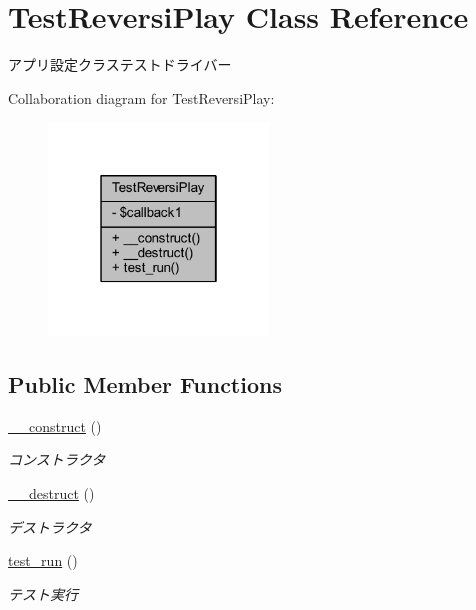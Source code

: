 \hypertarget{class_test_reversi_play}{}\section{Test\+Reversi\+Play Class Reference}
\label{class_test_reversi_play}


アプリ設定クラステストドライバー  




Collaboration diagram for Test\+Reversi\+Play\+:
\nopagebreak
\begin{figure}[H]
\begin{center}
\leavevmode
\includegraphics[width=166pt]{class_test_reversi_play__coll__graph}
\end{center}
\end{figure}
\subsection*{Public Member Functions}
\begin{DoxyCompactItemize}
\item 
\hyperlink{class_test_reversi_play_a095c5d389db211932136b53f25f39685}{\+\_\+\+\_\+construct} ()
\begin{DoxyCompactList}\small\item\em コンストラクタ \end{DoxyCompactList}\item 
\hyperlink{class_test_reversi_play_a421831a265621325e1fdd19aace0c758}{\+\_\+\+\_\+destruct} ()
\begin{DoxyCompactList}\small\item\em デストラクタ \end{DoxyCompactList}\item 
\hyperlink{class_test_reversi_play_a9b029832cfdf19c0ef36b1f5ef7b7735}{test\+\_\+run} ()
\begin{DoxyCompactList}\small\item\em テスト実行 \end{DoxyCompactList}\end{DoxyCompactItemize}
